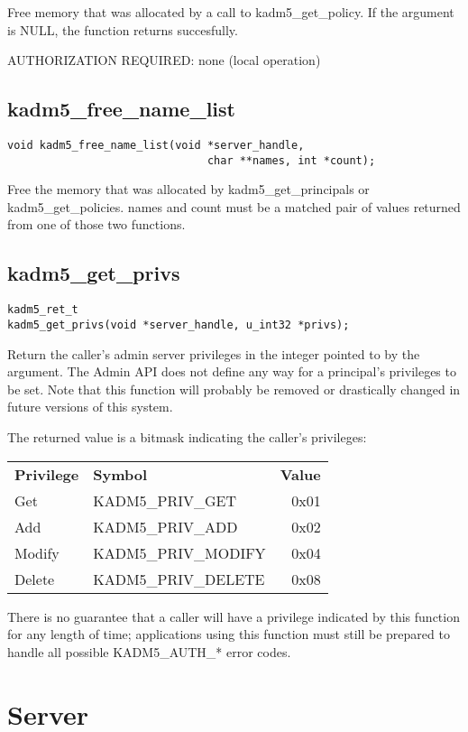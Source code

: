 Free memory that was allocated by a call to kadm5_get_policy.  If
the argument is NULL, the function returns succesfully.

AUTHORIZATION REQUIRED: none (local operation)

\subsection{kadm5_free_name_list}

\begin{verbatim}
void kadm5_free_name_list(void *server_handle,
                               char **names, int *count);
\end{verbatim}

Free the memory that was allocated by kadm5_get_principals or
kadm5_get_policies.  names and count must be a matched pair of
values returned from one of those two functions.

\subsection{kadm5_get_privs}

\begin{verbatim}
kadm5_ret_t
kadm5_get_privs(void *server_handle, u_int32 *privs);
\end{verbatim}

Return the caller's admin server privileges in the integer pointed to
by the argument.  The Admin API does not define any way for a
principal's privileges to be set.  Note that this function will
probably be removed or drastically changed in future versions of this
system.

The returned value is a bitmask indicating the caller's privileges:

\begin{tabular}{llr}
{\bf Privilege} & {\bf Symbol} & {\bf Value} \\
Get & KADM5_PRIV_GET & 0x01 \\
Add & KADM5_PRIV_ADD & 0x02 \\
Modify & KADM5_PRIV_MODIFY & 0x04 \\
Delete & KADM5_PRIV_DELETE & 0x08
\end{tabular}

There is no guarantee that a caller will have a privilege indicated by
this function for any length of time; applications using this function
must still be prepared to handle all possible KADM5_AUTH_* error
codes.

\section{Server}

